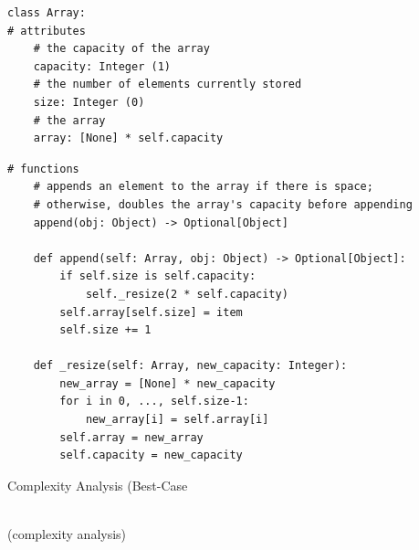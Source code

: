 \documentclass[mathserif, handout]{beamer}
\begin{document}
\begin{frame}[fragile]
\begin{thmboxtop}
\begin{lstlisting}[style=mypython]
class Array:
# attributes
    # the capacity of the array
    capacity: Integer (1)
    # the number of elements currently stored
    size: Integer (0)
    # the array
    array: [None] * self.capacity
\end{lstlisting}
\end{thmboxtop}
\end{frame}

\begin{frame}[fragile]
\begin{thmboxbot}
\begin{lstlisting}[style=mypython, firstnumber=last]
# functions
    # appends an element to the array if there is space;
    # otherwise, doubles the array's capacity before appending
    append(obj: Object) -> Optional[Object]

    def append(self: Array, obj: Object) -> Optional[Object]:
        if self.size is self.capacity:
            self._resize(2 * self.capacity)
        self.array[self.size] = item
        self.size += 1

    def _resize(self: Array, new_capacity: Integer):
        new_array = [None] * new_capacity
        for i in 0, ..., self.size-1:
            new_array[i] = self.array[i]
        self.array = new_array
        self.capacity = new_capacity
\end{lstlisting}
\end{thmboxbot}
\end{frame}

\begin{frame}{Complexity Analysis (Best-Case}
    \begin{center}
        \Large {} \\[1mm]
        \normalsize\color{gray} (complexity analysis)
    \end{center}
\end{frame}
\end{document}
